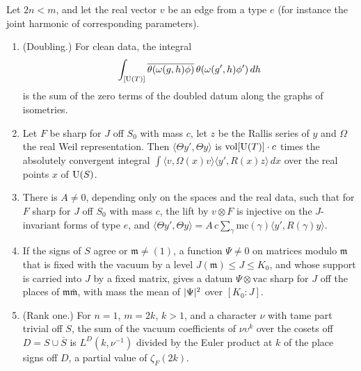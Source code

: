 \begin{theorem}\label{thm:B-rallis}
Let $2n<m$, and let the real vector $v$ be an edge from a type $e$ (for instance the joint harmonic of corresponding parameters).
\begin{enumerate}[label=\textup{(\alph*)}]
\item (Doubling.) For clean data, the integral
\[
  \int_{[\operatorname{U}(T)]}\overline{\theta(\omega(g,h)\phi)}\,\theta(\omega(g',h)\phi')\,dh
\]
is the sum of the zero terms of the doubled datum along the graphs of isometries.
\item Let $F$ be sharp for $J$ off $S_0$ with mass $c$, let $z$ be the Rallis series of $y$ and $\Omega$ the real Weil representation. Then $\langle\Theta y',\Theta y\rangle$ is $\operatorname{vol}[\operatorname{U}(T)]\cdot c$ times the absolutely
convergent integral $\int\langle v,\Omega(x)v\rangle\langle y',R(x)z\rangle\,dx$ over the real points $x$ of $\operatorname{U}(S)$.
\item There is $A\ne0$, depending only on the spaces and the real data, such that for $F$ sharp for $J$ off $S_0$ with mass $c$, the lift by $v\otimes F$ is injective on the $J$-invariant forms of
type $e$, and $\langle\Theta y',\Theta y\rangle=A\,c\sum_\gamma\mathrm{mc}(\gamma)\langle y',R(\gamma)y\rangle$.
\item If the signs of $S$ agree or $\mathfrak m\ne(1)$, a function $\Psi\ne0$ on matrices modulo $\mathfrak m$ that is fixed with the vacuum by a level $J(\mathfrak m)\le J\le K_0$, and whose support is
carried into $J$ by a fixed matrix, gives a datum $\Psi\otimes\mathrm{vac}$ sharp for $J$ off the places of $\mathfrak m\bar{\mathfrak m}$, with mass the mean of $\lvert \Psi\rvert^2$ over $[K_0:J]$.
\item (Rank one.) For $n=1$, $m=2k$, $k>1$, and a character $\nu$ with tame part trivial off $S$, the sum of the vacuum coefficients of $\nu\upsilon^k$ over the cosets off $D=S\cup\bar S$ is
$L^D(k,\nu^{-1})$ divided by the Euler product at $k$ of the place signs off $D$, a partial value of $\zeta_F(2k)$.
\end{enumerate}
\end{theorem}
